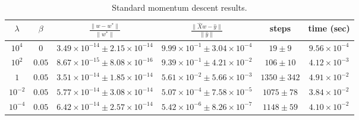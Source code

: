\begin{table}[H]
\small
\centering
\begin{tabular}{c|c|c|c|c|c} \hline \hline
    $\lambda$& $\beta$ &$\frac{\lVert w - w^{*} \lVert}{\rVert w^{*} \lVert}$ & $\frac{\lVert \hat{X}w - \hat{y} \lVert }{\lVert \hat{y} \lVert}$ & steps & time (sec)\\ \hline \hline
    
    \rowcolor{gray!30} $10^4$ & $0$ & $ 3.49 \times 10^{-14} \pm 2.15 \times 10^{-14}$ &$9.99 \times 10^{-1} \pm 3.04 \times 10^{-4}$ & $19 \pm 9$& $9.56 \times 10^{-4}$ \\
    
    $10^2$ & $ 0.05$ & $ 8.67 \times 10^{-15} \pm 8.08 \times 10^{-16}$ &$9.39 \times 10^{-1} \pm 4.21 \times 10^{-2}$&$106 \pm 10$& $4.12 \times 10^{-3}$ \\
    
    \rowcolor{gray!30} $1$ & $0.05$ & $ 3.51 \times 10^{-14} \pm 1.85 \times 10^{-14} $ &$ 5.61 \times 10^{-2} \pm 5.66 \times 10^{-3} $&$1350 \pm 342$& $4.91 \times 10^{-2}$ \\
    
    $10^{-2}$ & $ 0.05$ & $5.77 \times 10^{-14} \pm 3.08 \times 10^{-14}$ & $5.07 \times 10^{-4} \pm 7.58 \times 10^{-5}$&$1075 \pm 78$& $3.84 \times 10^{-2}$ \\
    
    \rowcolor{gray!30} $10^{-4}$ & $0.05$ & $6.42 \times 10^{-14} \pm 2.57 \times 10^{-14}$ &$5.42 \times 10^{-6} \pm 8.26 \times 10^{-7}$&$1148 \pm 59$ & $4.10 \times 10^{-2}$ \\
    \hline \hline
\end{tabular}
\caption{Standard momentum descent results.}
\label{tab:smd_results}
\end{table}
